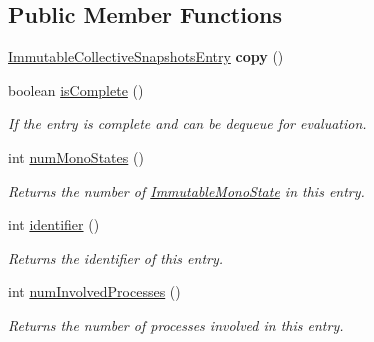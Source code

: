 \subsection*{Public Member Functions}
\begin{DoxyCompactItemize}
\item 
\hypertarget{classedu_1_1udel_1_1cis_1_1vsl_1_1civl_1_1state_1_1common_1_1immutable_1_1ImmutableCollectiveSnapshotsEntry_a017dbd2a302d56822814bc50bb7e747c}{}\hyperlink{classedu_1_1udel_1_1cis_1_1vsl_1_1civl_1_1state_1_1common_1_1immutable_1_1ImmutableCollectiveSnapshotsEntry}{Immutable\+Collective\+Snapshots\+Entry} {\bfseries copy} ()\label{classedu_1_1udel_1_1cis_1_1vsl_1_1civl_1_1state_1_1common_1_1immutable_1_1ImmutableCollectiveSnapshotsEntry_a017dbd2a302d56822814bc50bb7e747c}

\item 
boolean \hyperlink{classedu_1_1udel_1_1cis_1_1vsl_1_1civl_1_1state_1_1common_1_1immutable_1_1ImmutableCollectiveSnapshotsEntry_ac2b547b99129f44c114a81b36dd3a29b}{is\+Complete} ()
\begin{DoxyCompactList}\small\item\em If the entry is complete and can be dequeue for evaluation. \end{DoxyCompactList}\item 
int \hyperlink{classedu_1_1udel_1_1cis_1_1vsl_1_1civl_1_1state_1_1common_1_1immutable_1_1ImmutableCollectiveSnapshotsEntry_a18932f8001bcf4b4bc1534d7483e90a1}{num\+Mono\+States} ()
\begin{DoxyCompactList}\small\item\em Returns the number of \hyperlink{classedu_1_1udel_1_1cis_1_1vsl_1_1civl_1_1state_1_1common_1_1immutable_1_1ImmutableMonoState}{Immutable\+Mono\+State} in this entry. \end{DoxyCompactList}\item 
int \hyperlink{classedu_1_1udel_1_1cis_1_1vsl_1_1civl_1_1state_1_1common_1_1immutable_1_1ImmutableCollectiveSnapshotsEntry_a6da2ebf97e140b9ea7f46b57a85bca50}{identifier} ()
\begin{DoxyCompactList}\small\item\em Returns the identifier of this entry. \end{DoxyCompactList}\item 
int \hyperlink{classedu_1_1udel_1_1cis_1_1vsl_1_1civl_1_1state_1_1common_1_1immutable_1_1ImmutableCollectiveSnapshotsEntry_a7a120c066e24fc721640b3a0a2c36156}{num\+Involved\+Processes} ()
\begin{DoxyCompactList}\small\item\em Returns the number of processes involved in this entry. \end{DoxyCompactList}\item 

\end{DoxyCompactItemize}
